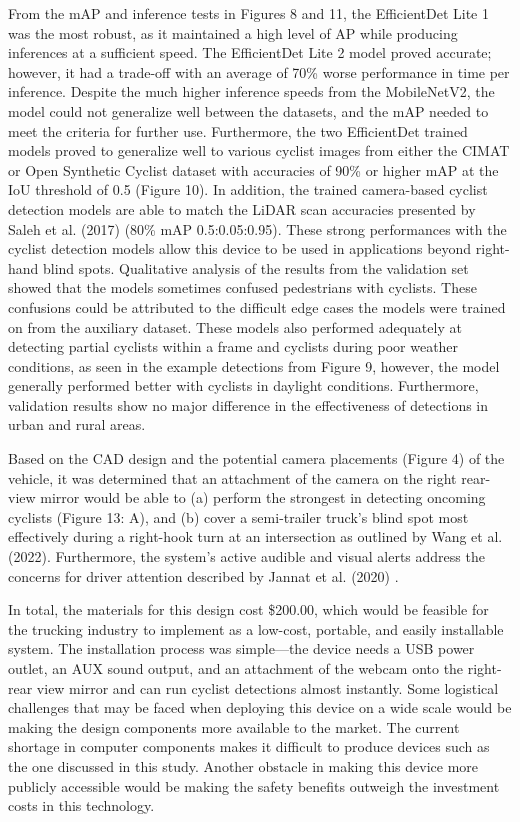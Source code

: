 \documentclass{article}
\begin{document}
From the mAP and inference tests in Figures 8 and 11, the EfficientDet Lite 1 was the most robust, as it maintained a high level of AP while producing inferences at a sufficient speed. The EfficientDet Lite 2 model proved accurate; however, it had a trade-off with an average of 70\% worse performance in time per inference. Despite the much higher inference speeds from the MobileNetV2, the model could not generalize well between the datasets, and the mAP needed to meet the criteria for further use. Furthermore, the two EfficientDet trained models proved to generalize well to various cyclist images from either the CIMAT or Open Synthetic Cyclist dataset with accuracies of 90\% or higher mAP at the IoU threshold of 0.5 (Figure 10). In addition, the trained camera-based cyclist detection models are able to match the LiDAR scan accuracies presented by Saleh et al. (2017) (80\% mAP 0.5:0.05:0.95). These strong performances with the cyclist detection models allow this device to be used in applications beyond right-hand blind spots. Qualitative analysis of the results from the validation set showed that the models sometimes confused pedestrians with cyclists. These confusions could be attributed to the difficult edge cases the models were trained on from the auxiliary dataset. These models also performed adequately at detecting partial cyclists within a frame and cyclists during poor weather conditions, as seen in the example detections from Figure 9, however, the model generally performed better with cyclists in daylight conditions. Furthermore, validation results show no major difference in the effectiveness of detections in urban and rural areas.

Based on the CAD design and the potential camera placements (Figure 4) of the vehicle, it was determined that an attachment of the camera on the right rear-view mirror would be able to (a) perform the strongest in detecting oncoming cyclists (Figure 13: A), and (b) cover a semi-trailer truck’s blind spot most effectively during a right-hook turn at an intersection as outlined by Wang et al. (2022). Furthermore, the system’s active audible and visual alerts address the concerns for driver attention described by Jannat et al. (2020) \cite{jannat_right-hook_2020}. 

In total, the materials for this design cost \$200.00, which would be feasible for the trucking industry to implement as a low-cost, portable, and easily installable system. The installation process was simple—the device needs a USB power outlet, an AUX sound output, and an attachment of the webcam onto the right-rear view mirror and can run cyclist detections almost instantly. Some logistical challenges that may be faced when deploying this device on a wide scale would be making the design components more available to the market. The current shortage in computer components makes it difficult to produce devices such as the one discussed in this study. Another obstacle in making this device more publicly accessible would be making the safety benefits outweigh the investment costs in this technology. 
\end{document}
